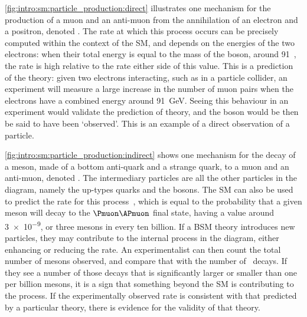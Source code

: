 \cref{fig:intro:sm:particle_production:direct} illustrates one mechanism for 
the production of a muon and an anti-muon from the annihilation of an electron 
and a positron, denoted \decay{\Pelectron\APelectron}{\Pmuon\APmuon}.
The rate at which this process occurs can be precisely computed within the 
context of the \ac{SM}, and depends on the energies of the two electrons: when 
their total energy is equal to the mass of the \PZ boson, around 
\SI{91}{\GeVcc}~\cite{PDG2014}, the rate is high relative to the rate either 
side of this value.
This is a prediction of the theory: given two electrons interacting, such as in 
a particle collider, an experiment will measure a large increase in the number 
of muon pairs when the electrons have a combined energy around \SI{91}{\GeV}.
Seeing this behaviour in an experiment would validate the prediction of theory, 
and the \PZ boson would be then be said to have been `observed'.
This is an example of a direct observation of a particle.

\cref{fig:intro:sm:particle_production:indirect} shows one mechanism for the 
decay of a \PBs meson, made of a bottom anti-quark and a strange quark, to a 
muon and an anti-muon, denoted \BsTomumu.
The intermediary particles are all the other particles in the diagram, namely 
the up-types quarks and the \PW bosons.
The \ac{SM} can also be used to predict the rate for this 
process~\cite{Bobeth:2013uxa}, which is equal to the probability that a given 
\PBs meson will decay to the $\Pmuon\APmuon$ final state, having a value around 
\num{3e-9}, or three \PBs mesons in every ten billion.
If a \ac{BSM} theory introduces new particles, they may contribute to the 
internal process in the diagram, either enhancing or reducing the rate.
An experimentalist can then count the total number of \PBs mesons observed, and 
compare that with the number of \BsTomumu\ decays.
If they see a number of those decays that is significantly larger or smaller 
than one per billion \PBs mesons, it is a sign that something beyond the 
\ac{SM} is contributing to the process.
If the experimentally observed rate is consistent with that predicted by a 
particular theory, there is evidence for the validity of that theory.

